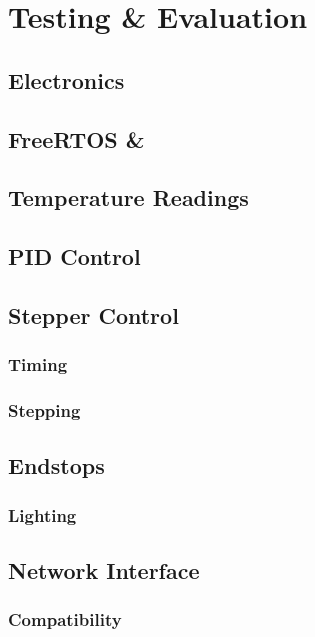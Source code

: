 \chapter{Testing \& Evaluation}
	
	\section{Electronics}
	
	\section{FreeRTOS \& \uIP}
	
	\section{Temperature Readings}
	
	\section{PID Control}
	
	\section{Stepper Control}
		
		\subsection{Timing}
		
		\subsection{Stepping}
	
	\section{Endstops}
		
		\subsection{Lighting}
	
	\section{Network Interface}
		
		\subsection{Compatibility}
		
